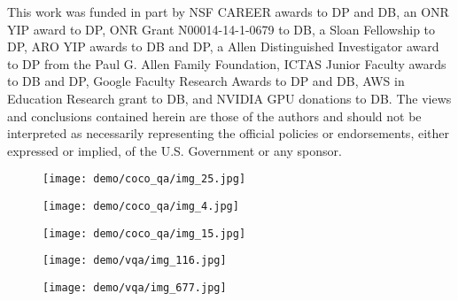 \documentclass{article}
\begin{document}
\small{This work was funded in part by NSF CAREER awards to DP and DB, an ONR YIP award to DP, ONR Grant N00014-14-1-0679 to DB, a Sloan Fellowship to DP, ARO YIP awards to DB and DP, a Allen Distinguished Investigator award to DP from the Paul G. Allen Family Foundation, ICTAS Junior Faculty awards to DB and DP, Google Faculty Research Awards to DP and DB, AWS in Education Research grant to DB, and NVIDIA GPU donations to DB. The views and conclusions contained herein are those of the authors and should not be interpreted as necessarily representing the official policies or endorsements, either expressed or implied, of the U.S. Government or any sponsor. 
} \begin{figure}[p]
\begin{minipage}{0.19\linewidth}
\texttt{[image: demo/coco\_qa/img\_25.jpg]}
\end{minipage}
\begin{minipage}{0.19\linewidth}
\texttt{[image: demo/coco\_qa/img\_4.jpg]}
\end{minipage}
\begin{minipage}{0.19\linewidth}
\texttt{[image: demo/coco\_qa/img\_15.jpg]}
\end{minipage}
\begin{minipage}{0.19\linewidth}
\texttt{[image: demo/vqa/img\_116.jpg]}
\end{minipage}
\begin{minipage}{0.19\linewidth}
\texttt{[image: demo/vqa/img\_677.jpg]}
\end{minipage}


\end{figure}
\end{document}
